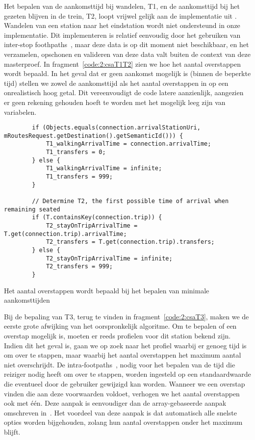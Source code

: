 Het bepalen van de aankomsttijd bij wandelen, T1, en de aankomsttijd bij het gezeten blijven in de trein, T2, loopt vrijwel gelijk aan de implementatie uit \cite{strasser17}. Wandelen van een station naar het eindstation wordt niet ondersteund in onze implementatie. Dit implementeren is relatief eenvoudig door het gebruiken van inter-stop foothpaths~\citep{strasser17,hannemann08}, maar deze data is op dit moment niet beschikbaar, en het verzamelen, opschonen en valideren van deze data valt buiten de context van deze masterproef. In fragment~\ref{code:2:csaT1T2} zien we hoe het aantal overstappen wordt bepaald. In het geval dat er geen aankomst mogelijk is (binnen de beperkte tijd) stellen we zowel de aankomsttijd als het aantal overstappen in op een onrealistisch hoog getal. Dit vereenvoudigt de code latere aanzienlijk, aangezien er geen rekening gehouden hoeft te worden met het mogelijk leeg zijn van variabelen.
\begin{code}
	\begin{verbatim}
	 	if (Objects.equals(connection.arrivalStationUri, mRoutesRequest.getDestination().getSemanticId())) {
			T1_walkingArrivalTime = connection.arrivalTime;
			T1_transfers = 0;
		} else {
			T1_walkingArrivalTime = infinite;
			T1_transfers = 999;
		}

		// Determine T2, the first possible time of arrival when remaining seated
		if (T.containsKey(connection.trip)) {
			T2_stayOnTripArrivalTime = T.get(connection.trip).arrivalTime;
			T2_transfers = T.get(connection.trip).transfers;
		} else {
			T2_stayOnTripArrivalTime = infinite;
			T2_transfers = 999;
		}	
		\end{verbatim}
					\caption[CSA: Bepalen van aankomsttijden]{Het aantal overstappen wordt bepaald bij het bepalen van minimale aankomsttijden}
		\label{code:2:csaT1T2}
\end{code}

Bij de bepaling van T3, terug te vinden in fragment~\ref{code:2:csaT3}, maken we de eerste grote afwijking van het oorspronkelijk algoritme. Om te bepalen of een overstap mogelijk is, moeten er reeds profielen voor dit station bekend zijn. Indien dit het geval is, gaan we op zoek naar het profiel waarbij er genoeg tijd is om over te stappen, maar waarbij het aantal overstappen het maximum aantal niet overschrijdt. 
De intra-footpaths~\citep{strasser17,hannemann08}, nodig voor het bepalen van de tijd die reiziger nodig heeft om over te stappen, worden ingesteld op een standaardwaarde die eventueel door de gebruiker gewijzigd kan worden.
Wanneer we een overstap vinden die aan deze voorwaarden voldoet, verhogen we het aantal overstappen ook met één. Deze aanpak is eenvoudiger dan de array-gebaseerde aanpak omschreven in~\cite{strasser17}. Het voordeel van deze aanpak is dat automatisch alle snelste opties worden bijgehouden, zolang hun aantal overstappen onder het maximum blijft. 


